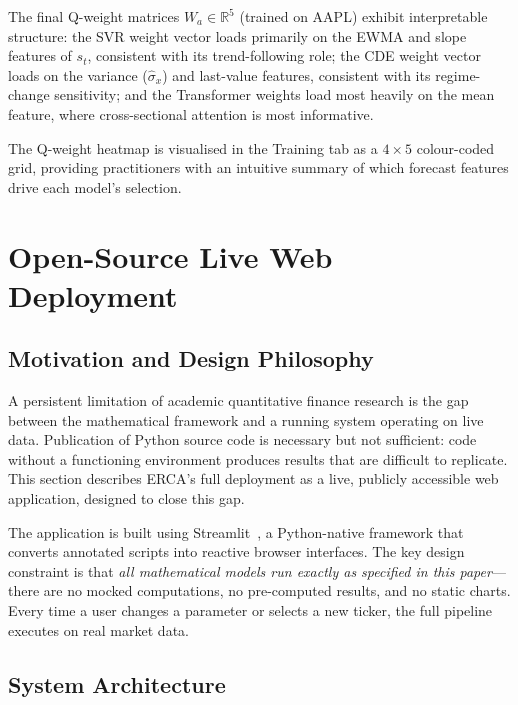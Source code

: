 \documentclass[10pt,twocolumn]{article}
\newcommand{\R}{\mathbb{R}}
\begin{document}
The final Q-weight matrices $W_a\in\R^5$ (trained on AAPL) exhibit
interpretable structure: the SVR weight vector loads primarily on the EWMA
and slope features of $s_t$, consistent with its trend-following role; the
CDE weight vector loads on the variance ($\hat{\sigma}_x$) and last-value
features, consistent with its regime-change sensitivity; and the Transformer
weights load most heavily on the mean feature, where cross-sectional
attention is most informative.

The Q-weight heatmap is visualised in the Training tab as a
$4\times5$ colour-coded grid, providing practitioners with an intuitive
summary of which forecast features drive each model's selection.

\section{Open-Source Live Web Deployment}
\label{sec:deployment}

\subsection{Motivation and Design Philosophy}

A persistent limitation of academic quantitative finance research is the
gap between the mathematical framework and a running system operating on
live data. Publication of Python source code is necessary but not sufficient:
code without a functioning environment produces results that are difficult to
replicate. This section describes ERCA's full deployment as a live,
publicly accessible web application, designed to close this gap.

The application is built using Streamlit~\cite{streamlit2019}, a
Python-native framework that converts annotated scripts into reactive
browser interfaces. The key design constraint is that \emph{all mathematical
models run exactly as specified in this paper}---there are no mocked
computations, no pre-computed results, and no static charts. Every time a
user changes a parameter or selects a new ticker, the full pipeline executes
on real market data.

\subsection{System Architecture}
\end{document}
